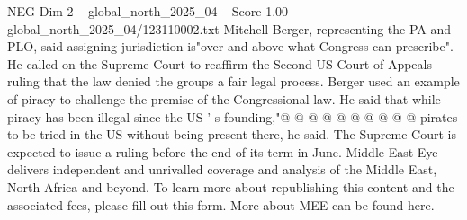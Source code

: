 \begin{textsample}{NEG Dim 2 – global\_north\_2025\_04 – Score 1.00 – global\_north\_2025\_04/123110002.txt}
Mitchell Berger, representing the PA and PLO, said assigning jurisdiction is"over and above what Congress can prescribe".
He called on the Supreme Court to reaffirm the Second US Court of Appeals ruling that the law denied the groups a fair legal process.
Berger used an example of piracy to challenge the premise of the Congressional law.
He said that while piracy has been illegal since the US ' s founding,"@ @ @ @ @ @ @ @ @ @ pirates to be tried in the US without being present there, he said.
The Supreme Court is expected to issue a ruling before the end of its term in June.
Middle East Eye delivers independent and unrivalled coverage and analysis of the Middle East, North Africa and beyond.
To learn more about republishing this content and the associated fees, please fill out this form.
More about MEE can be found here.

\end{textsample}
